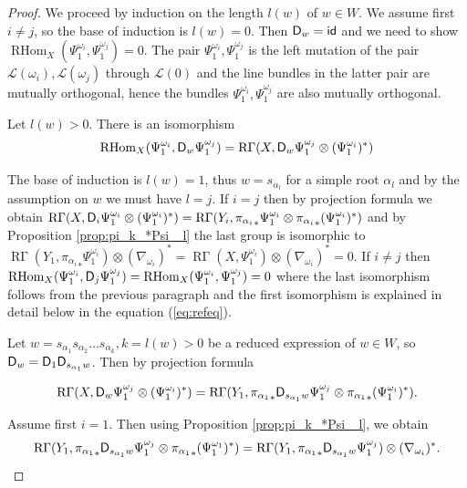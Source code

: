 \documentclass[sn-mathphys-num]{sn-jnl}%
\newcommand{\Ll}{\mathcal L}
\newcommand*{\RGamma}{\mathop{\mathrm {R\Gamma}}\nolimits}
\newcommand*{\RHom}{\mathop{\mathrm {RHom}}\nolimits}
\theoremstyle{definition}
\begin{document}
\begin{proof}
We proceed by induction on the length $l(w)$ of $w\in W$. We assume first $i\neq j$, so the base of induction is $l(w)=0$. Then ${\sf D}_w={\sf id}$ and we need to show $\RHom _X(\Psi _1^{\omega _i},\Psi _1^{\omega _j})=0$. The pair $\Psi _1^{\omega _i},\Psi _1^{\omega _j}$ is the left mutation of the pair $\Ll (\omega _i),\Ll (\omega _j)$ through $\Ll (0)$ and the line bundles in the latter pair are mutually orthogonal, hence the bundles $\Psi _1^{\omega _i},\Psi _1^{\omega _j}$ are also mutually orthogonal.

Let $l(w)>0$. There is an isomorphism
\begin{equation}
\RHom _X(\Psi _1^{\omega _i},{\sf D}_w\Psi _1^{\omega _j})=\RGamma (X,{\sf D}_w\Psi _1^{\omega _j}\otimes (\Psi _1^{\omega _i})^{\ast})
\end{equation}

The base of induction is $l(w)=1$, thus $w=s_{\alpha _l}$ for a simple root $\alpha _l$ and by the assumption on $w$ we must have $l=j$. If $i=j$ then by projection formula we obtain $\RGamma (X,{\sf D}_i\Psi _1^{\omega _i}\otimes (\Psi _1^{\omega _i})^{\ast})=\RGamma (Y_i,{\pi _{\alpha _i}}_{\ast}\Psi _1^{\omega _i}\otimes {\pi _{\alpha _i}}_{\ast}(\Psi _1^{\omega _i})^{\ast})$
and by Proposition \ref{prop:pi_k_*Psi _l} the last group is isomorphic to 
$\RGamma (Y_1,{\pi _{\alpha _i}}_{\ast}\Psi _1^{\omega _i})\otimes (\nabla _{\omega _i})^{\ast}=\RGamma (X,\Psi _1^{\omega _i})\otimes (\nabla _{\omega _i})^{\ast}=0$. If $i\neq j$ then $\RHom _X(\Psi _1^{\omega _i},{\sf D}_j\Psi _1^{\omega _j})=\RHom _X(\Psi _1^{\omega _i},\Psi _1^{\omega _j})=0$ where the last isomorphism follows from the previous paragraph and the first isomorphism 
is explained in detail below in the equation (\ref{eq:refeq}).

Let $w = s_{\alpha _1}s_{\alpha _2}\dots s_{\alpha _k}, k=l(w)>0$ be a reduced expression of $w\in W$, so ${\sf D}_w={\sf D}_1{\sf D}_{s_{\alpha _1}w}$. Then by projection formula 

\begin{equation}
\RGamma (X,{\sf D}_w\Psi _1^{\omega _j}\otimes (\Psi _1^{\omega _i})^{\ast})=\RGamma (Y_1,{\pi _{\alpha _1}}_{\ast}{\sf D}_{s_{\alpha _1}w}\Psi _1^{\omega _j}\otimes {\pi _{\alpha _1}}_{\ast}(\Psi _1^{\omega _i})^{\ast}).
\end{equation}

Assume first $i=1$. Then using Proposition \ref{prop:pi_k_*Psi _l}, we obtain
\begin{equation}
\RGamma (Y_1,{\pi _{\alpha _1}}_{\ast}{\sf D}_{s_{\alpha _1}w}\Psi _1^{\omega _j}\otimes {\pi _{\alpha _1}}_{\ast}(\Psi _1^{\omega _1})^{\ast})=\RGamma (Y_1,{\pi _{\alpha _1}}_{\ast}{\sf D}_{s_{\alpha _1}w}\Psi _1^{\omega _j})\otimes (\nabla _{\omega _i})^{\ast}.
\end{equation}


\end{proof}
\end{document}
